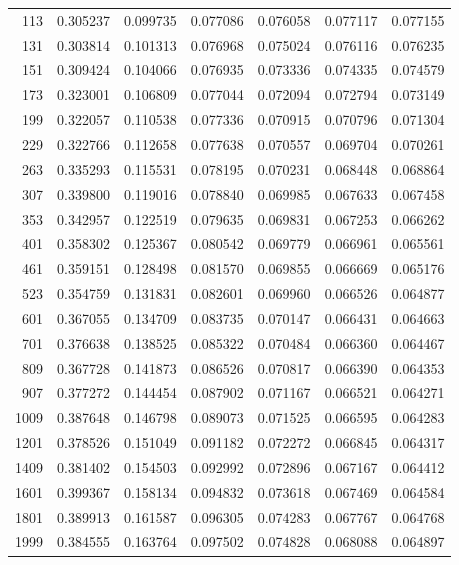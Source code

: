 \documentclass[11pt,reqno]{amsart}
\numberwithin{equation}{section}
\theoremstyle{plain}
\theoremstyle{definition}
\theoremstyle{remark}
\begin{document}
\begin{center}
\begin{longtable}{rrrrrrr}
113 & 0.305237 & 0.099735 & 0.077086 & 0.076058 & 0.077117 & 0.077155\\
131 & 0.303814 & 0.101313 & 0.076968 & 0.075024 & 0.076116 & 0.076235\\
151 & 0.309424 & 0.104066 & 0.076935 & 0.073336 & 0.074335 & 0.074579\\
173 & 0.323001 & 0.106809 & 0.077044 & 0.072094 & 0.072794 & 0.073149\\
199 & 0.322057 & 0.110538 & 0.077336 & 0.070915 & 0.070796 & 0.071304\\
229 & 0.322766 & 0.112658 & 0.077638 & 0.070557 & 0.069704 & 0.070261\\
263 & 0.335293 & 0.115531 & 0.078195 & 0.070231 & 0.068448 & 0.068864\\
307 & 0.339800 & 0.119016 & 0.078840 & 0.069985 & 0.067633 & 0.067458\\
353 & 0.342957 & 0.122519 & 0.079635 & 0.069831 & 0.067253 & 0.066262\\
401 & 0.358302 & 0.125367 & 0.080542 & 0.069779 & 0.066961 & 0.065561\\
461 & 0.359151 & 0.128498 & 0.081570 & 0.069855 & 0.066669 & 0.065176\\
523 & 0.354759 & 0.131831 & 0.082601 & 0.069960 & 0.066526 & 0.064877\\
601 & 0.367055 & 0.134709 & 0.083735 & 0.070147 & 0.066431 & 0.064663\\
701 & 0.376638 & 0.138525 & 0.085322 & 0.070484 & 0.066360 & 0.064467\\
809 & 0.367728 & 0.141873 & 0.086526 & 0.070817 & 0.066390 & 0.064353\\
907 & 0.377272 & 0.144454 & 0.087902 & 0.071167 & 0.066521 & 0.064271\\
1009 & 0.387648 & 0.146798 & 0.089073 & 0.071525 & 0.066595 & 0.064283\\
1201 & 0.378526 & 0.151049 & 0.091182 & 0.072272 & 0.066845 & 0.064317\\
1409 & 0.381402 & 0.154503 & 0.092992 & 0.072896 & 0.067167 & 0.064412\\
1601 & 0.399367 & 0.158134 & 0.094832 & 0.073618 & 0.067469 & 0.064584\\
1801 & 0.389913 & 0.161587 & 0.096305 & 0.074283 & 0.067767 & 0.064768\\
1999 & 0.384555 & 0.163764 & 0.097502 & 0.074828 & 0.068088 & 0.064897\\
\bottomrule
\end{longtable}
\end{center}
\end{document}
